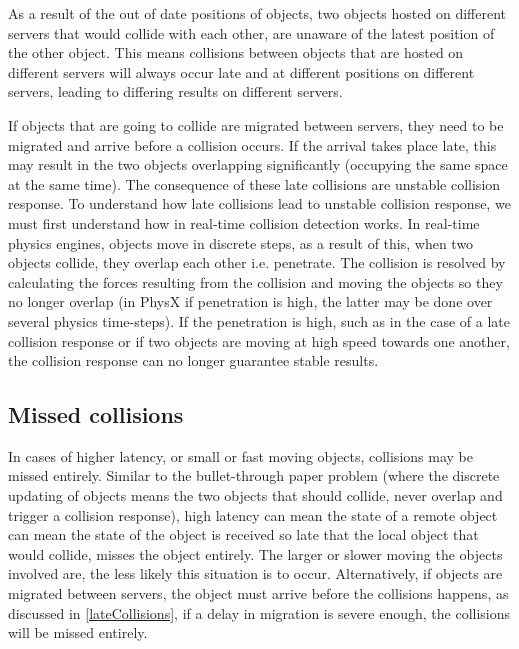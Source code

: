 As a result of the out of date positions of objects, two objects hosted on different servers that would collide with each other, are unaware of the latest position of the other object. This means collisions between objects that are hosted on different servers will always occur late and at different positions on different servers, leading to differing results on different servers.

If objects that are going to collide are migrated between servers, they need to be migrated and arrive before a collision occurs. If the arrival takes place late, this may result in the two objects overlapping significantly (occupying the same space at the same time). The consequence of these late collisions are unstable collision response. To understand how late collisions lead to unstable collision response, we must first understand how in real-time collision detection works. In real-time physics engines, objects move in discrete steps, as a result of this, when two objects collide, they overlap each other i.e. penetrate. The collision is resolved by calculating the forces resulting from the collision and moving the objects so they no longer overlap (in PhysX if penetration is high, the latter may be done over several physics time-steps). If the penetration is high, such as in the case of a late collision response or if two objects are moving at high speed towards one another, the collision response can no longer guarantee stable results.


\subsection{Missed collisions}
In cases of higher latency, or small or fast moving objects, collisions may be missed entirely. Similar to the bullet-through paper problem (where the discrete updating of objects means the two objects that should collide, never overlap and trigger a collision response), high latency can mean the state of a remote object can mean the state of the object is received so late that the local object that would collide, misses the object entirely. The larger or slower moving the objects involved are, the less likely this situation is to occur. Alternatively, if objects are migrated between servers, the object must arrive before the collisions happens, as discussed in \ref{lateCollisions}, if a delay in migration is severe enough, the collisions will be missed entirely.

